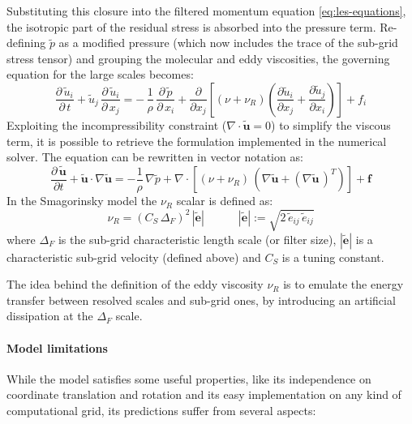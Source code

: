\documentclass[12pt, a4paper, twoside, openright]{book}
\begin{document}
Substituting this closure into the filtered momentum equation \eqref{eq:les-equations}, the isotropic part of the residual stress is absorbed into the pressure term. Re-defining $\widetilde{p}$ as a modified pressure (which now includes the trace of the sub-grid stress tensor) and grouping the molecular and eddy viscosities, the governing equation for the large scales becomes:
\begin{equation}
    \frac{\partial \, \widetilde{u}_i}{\partial \, t} + \widetilde{u}_j \, \frac{\partial \, \widetilde{u}_i}{\partial \, x_j} = - \, \frac{1}{\rho} \, \frac{\partial \, \widetilde{p}}{\partial \, x_i} + \frac{\partial}{\partial x_j} \left[ (\nu + \nu_{R}) \left( \frac{\partial \widetilde{u}_i}{\partial x_j} + \frac{\partial \widetilde{u}_j}{\partial x_i} \right) \right] + f_i
\end{equation}
Exploiting the incompressibility constraint ($\nabla \cdot \bm{\widetilde{u}} = 0$) to simplify the viscous term, it is possible to retrieve the formulation implemented in the numerical solver. The equation can be rewritten in vector notation as:
\begin{equation}
    \frac{\partial \, \bm{\widetilde{u}}}{\partial t} + \bm{\widetilde{u}} \cdot \nabla \bm{\widetilde{u}} = - \frac{1}{\rho} \, \nabla \widetilde{p} + \nabla \cdot \left[ (\nu + \nu_{R}) \, \left(\nabla \bm{\widetilde{u}} + \left( \nabla \bm{\widetilde{u}} \, \right)^T \right) \right] + \bm{f}
	\label{eq:les-mom-equation}
\end{equation}
In the Smagorinsky model the $\nu_R$ scalar is defined as:
\begin{equation}
	\nu_R = (C_S \, \Delta_F)^2 \, |\bm{\widetilde{e}}| \qquad \quad |\bm{\widetilde{e}}| := \sqrt{2 \, \widetilde{e}_{ij} \, \widetilde{e}_{ij}}
\end{equation}
where $\Delta_F$ is the sub-grid characteristic length scale (or filter size), $|\bm{\widetilde{e}}|$ is a characteristic sub-grid velocity (defined above) and $C_S$ is a tuning constant.

The idea behind the definition of the eddy viscosity $\nu_R$ is to emulate the energy transfer between resolved scales and sub-grid ones, by introducing an artificial dissipation at the $\Delta_F$ scale.

\paragraph{Model limitations}

While the model satisfies some useful properties, like its independence on coordinate translation and rotation and its easy implementation on any kind of computational grid, its predictions suffer from several aspects:
\end{document}

